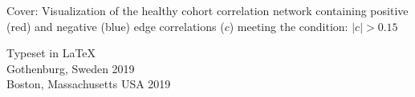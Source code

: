 \vfill
Cover: Visualization of the healthy cohort correlation network containing positive (red) and negative (blue) edge correlations ($c$) meeting the condition: $\left| c \right| > 0.15$ \setlength{\parskip}{0.5cm}

Typeset in \LaTeX \\
Gothenburg, Sweden 2019 \\
Boston, Massachusetts USA 2019

